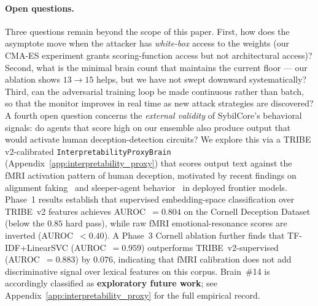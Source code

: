 \documentclass{article}
\begin{document}
\paragraph{Open questions.}
Three questions remain beyond the scope of this paper.
First, how does the asymptote move when the attacker has
\emph{white-box} access to the weights (our CMA-ES experiment
grants scoring-function access but not architectural access)?
Second, what is the minimal brain count that maintains the
current floor --- our ablation shows $13 \to 15$ helps, but we have
not swept downward systematically? Third, can the adversarial
training loop be made continuous rather than batch, so that the
monitor improves in real time as new attack strategies are
discovered?
A fourth open question concerns the \emph{external validity} of
SybilCore's behavioral signals: do agents that score high on our
ensemble also produce output that would activate human
deception-detection circuits? We explore this via a TRIBE
v2-calibrated \texttt{InterpretabilityProxyBrain}
(Appendix~\ref{app:interpretability_proxy}) that scores output text
against the fMRI activation pattern of human deception, motivated
by recent findings on alignment faking~\cite{greenblatt2024alignment}
and sleeper-agent behavior~\cite{hubinger2024sleeper} in deployed
frontier models. Phase~1 results establish that supervised embedding-space
classification over TRIBE~v2 features achieves AUROC~$= 0.804$ on the
Cornell Deception Dataset (below the $0.85$ hard pass), while raw fMRI
emotional-resonance scores are inverted (AUROC~$< 0.40$). A Phase~3
Cornell ablation further finds that TF-IDF+LinearSVC (AUROC~$= 0.959$)
outperforms TRIBE~v2-supervised (AUROC~$= 0.883$) by $0.076$,
indicating that fMRI calibration does not add discriminative signal over
lexical features on this corpus. Brain~\#14 is accordingly classified as
\textbf{exploratory future work}; see Appendix~\ref{app:interpretability_proxy}
for the full empirical record.

\end{document}
